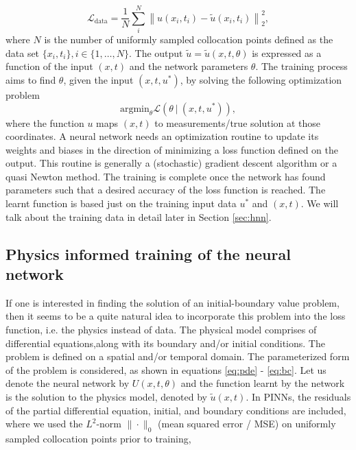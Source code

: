 \begin{equation}\label{eq:fct_data}
\mathcal{L}_{\mathrm{data}}= \frac{1}{N} \sum_i^N \left\| u(x_i,t_i) - \tilde{u}(x_i,t_i) \right\|_2^2,
\end{equation}
where  $N$ is the number of uniformly sampled collocation points defined 
as the data set $\{ x_i,t_i \}, i \in \{1, \ldots, N\}$.  The output $\tilde{u} = \tilde{u} (x, t, \theta)$ is
expressed as a function of the input $(x, t)$ and the network parameters $\theta$. The training process aims to find $\theta$, given the input $(x, t, u^*)$, by solving the following optimization problem 
\[
\mbox{argmin}_\theta \mathcal{L} \left(\theta\ | \ (x,t ,u^*)\right),
\]
where the function $u$ maps $(x, t)$ to measurements/true solution at those coordinates. A neural network needs an optimization routine to update its weights and biases in the direction of minimizing a loss function defined on the output. This routine is generally a (stochastic) gradient descent algorithm or a quasi Newton method.  The training is complete once the network has found parameters such that a desired accuracy of the loss function is reached. The learnt function is based just on the training input data $u^*$ and $(x,t)$. We will talk about the training data in detail later in Section \ref{sec:hnn}. 

\subsection{Physics informed training of the neural network}
\label{sec:pinns}

If one is interested in finding the solution of an initial-boundary value problem, then it seems to be a quite natural idea to incorporate this problem into the loss function, i.e. the physics instead of data. The physical model comprises of differential equations,along with its boundary and/or initial conditions. The problem is defined on a spatial and/or temporal domain. The  parameterized form of the problem is considered, as shown in equations \ref{eq:pde} -  \ref{eq:bc}. Let us denote the neural network by   
$U(x, t, \theta )$ and the function learnt by the network is the solution to the physics model, denoted by $\tilde{u}(x,t)$. 
In PINNs,  the residuals of the partial differential equation, initial, and boundary conditions are included, 
where we used the $L^2$-norm $\|\cdot\|_0$  (mean squared error / MSE) on uniformly sampled collocation points prior to training,    

